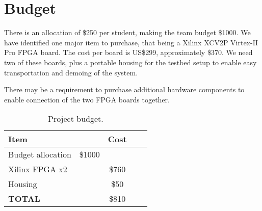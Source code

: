 \section{Budget}

There is an allocation of \$250 per student, making the team budget
\$1000. We have identified one major item to purchase,
that being a Xilinx XCV2P Virtex-II Pro FPGA board. The cost per board is
US\$299, approximately \$370. We need two of these boards, plus a portable housing for the testbed setup to enable easy transportation and demoing of the system.

There may be a requirement to purchase additional hardware components to enable connection of the two FPGA boards together.

\begin{table}[h]
\begin{tabular}{|l|c|c|c|c|}
  \hline
  \textbf{Item} & &\textbf{Cost} \\
  \hline
  \hline
  Budget allocation & \$1000 & \\
  \hline
  Xilinx FPGA x2 & & \$760 \\
  \hline
  Housing & & \$50 \\
  \hline
  \hline
  \textbf{TOTAL} & & \$810 \\
  \hline
\end{tabular}
\caption{Project budget. }
 \label{budget}
\end{table}


